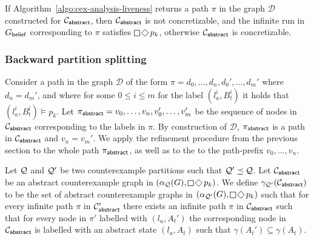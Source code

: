 \begin{theorem}
If Algorithm~\ref{algo:cex-analysis-liveness} returns a path $\pi$ in the graph $\mathcal D$ constructed for $\mathcal{C}_{\mathsf{abstract}}$, then $\mathcal{C}_{\mathsf{abstract}}$ is not concretizable, and the infinite run in $G_{\mathsf{belief}}$ corresponding to $\pi$ satisfies $\LTLglobally\LTLfinally p_k$, otherwise  $\mathcal{C}_{\mathsf{abstract}}$ is concretizable.
\end{theorem}

\subsubsection{Backward partition splitting}

Consider a path in the graph $\mathcal{D}$ of the form $\pi = d_0,\ldots, d_n,d_0',\ldots,d_m'$ where $d_n = d_m'$, and where for some $0 \leq i \leq m$ for the label $(l_a^i,B_t^i)$ it holds that $(l_a^i,B_t^i) \models p_k$. Let 
$\pi_{\mathsf{abstract}} = v_0,\ldots, v_n,v_0',\ldots,v_m'$ be the sequence of nodes in $\mathcal{C}_{\mathsf{abstract}}$ corresponding to the labels in $\pi$. By construction of $\mathcal D$, $\pi_{\mathsf{abstract}}$ is a path in $\mathcal{C}_{\mathsf{abstract}}$ and $v_n = v_m'$. We apply the refinement procedure from the previous section to the whole path $\pi_{\mathsf{abstract}}$, as well as to the to the path-prefix $v_0,\ldots, v_n$.

Let $\mathcal{Q}$ and $\mathcal{Q}'$ be two counterexample partitions such that $\mathcal{Q}' \preceq \mathcal{Q}$. Let $\mathcal{C}_{\mathsf{abstract}}$ be an abstract counterexample graph in $(\alpha_\part(G),\LTLglobally\LTLfinally p_k)$. We define $\gamma_{\mathcal{Q}'}(\mathcal{C}_{\mathsf{abstract}})$ to be the set of abstract counterexample graphs in $(\alpha_{\part'}(G),\LTLglobally\LTLfinally p_k)$ such that for every infinite path $\pi$ in $\mathcal{C}_{\mathsf{abstract}}'$ there exists an infinite path $\pi$ in $\mathcal{C}_{\mathsf{abstract}}$ such that for every node in $\pi'$ labelled with $(l_a,A_t')$ the corresponding node in $\mathcal{C}_{\mathsf{abstract}}$ is labelled with an abstract state $(l_a,A_t)$ such that $\gamma(A_t') \subseteq \gamma(A_t)$.

